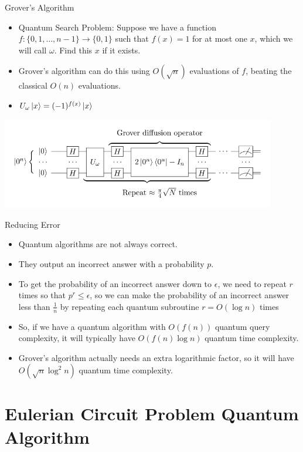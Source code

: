 \documentclass[aspectratio=169, handout]{beamer}
\begin{document}
\begin{frame}{Grover's Algorithm}
\begin{itemize}
    \item Quantum Search Problem: Suppose we have a function $f: \{0, 1, \dots, n - 1\} \to \{0, 1\}$ such that $f(x) = 1$ for at most one $x$, which we will call $\omega$. Find this $x$ if it exists. \pause
    \item Grover's algorithm can do this using $O(\sqrt{n})$ evaluations of $f$, beating the classical $O(n)$ evaluations. \pause
    \item $U_\omega\ket{x} = (-1)^{f(x)}\ket{x}$
\end{itemize}
\begin{center}
\includegraphics[width=120mm]{Grover.png} \cite{site:grover}
\end{center}
\end{frame}

\begin{frame}{Reducing Error}
\begin{itemize}
    \item Quantum algorithms are not always correct. \pause
    \item They output an incorrect answer with a probability $p$. \pause
    \item To get the probability of an incorrect answer down to $\epsilon$, we need to repeat $r$ times so that $p^r \leq \epsilon$, so we can make the probability of an incorrect answer less than $\frac{1}{n}$ by repeating each quantum subroutine $r = O(\log n)$ times \pause
    \item So, if we have a quantum algorithm with $O(f(n))$ quantum query complexity, it will typically have $O(f(n) \log n)$ quantum time complexity. \pause
    \item Grover's algorithm actually needs an extra logarithmic factor, so it will have $O(\sqrt{n} \log^2 n)$ quantum time complexity. 
\end{itemize}
\end{frame}



\section{Eulerian Circuit Problem Quantum Algorithm}
\frame{\sectionpage}
\end{document}
